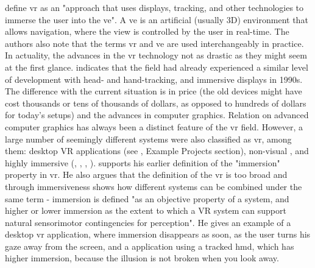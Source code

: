 \cite{jr_3d_2017} define \gls{vr} as an "approach that uses displays, tracking, and other technologies to immerse the user into the \gls{ve}". A \gls{ve} is an artificial (usually 3D) environment that allows navigation, where the view is controlled by the user in real-time. The authors also note that the terms \gls{vr} and \gls{ve} are used interchangeably in practice. 
In actuality, the advances in the \gls{vr} technology not as drastic as they might seem at the first glance. \cite{slater_immersion_2018} indicates that the field had already experienced a similar level of development with head- and hand-tracking, and immersive displays in 1990s. The difference with the current situation is in price (the old devices might have cost thousands or tens of thousands of dollars, as opposed to hundreds of dollars for today's setups) and the advances in computer graphics.
Relation on advanced computer graphics has always been a distinct feature of the \gls{vr} field. However, a large number of seemingly different systems were also classified as \gls{vr}, among them: desktop VR applications (see \cite{churchill_collaborative_1998}, Example Projects section), non-visual \cite{ammi_intermodal_2015}, and highly immersive (\cite{davidson_greenspace_1996}, \cite{greenwald_cocoverse_nodate}, \cite{lena_real-time_nodate}, \cite{kulik_virtual_2018}). \cite{slater_immersion_2018} supports his earlier definition of the "immersion" property in \gls{vr}. He also argues that the definition of the \gls{vr} is too broad and through immersiveness shows how different systems can be combined under the same term - immersion is defined "as an objective property of a system, and higher or lower immersion as the extent to which a VR system can support natural sensorimotor contingencies for perception". He gives an example of a desktop \gls{vr} application, where immersion disappears as soon, as the user turns his gaze away from the screen, and a application using a tracked \gls{hmd}, which has higher immersion, because the illusion is not broken when you look away.




